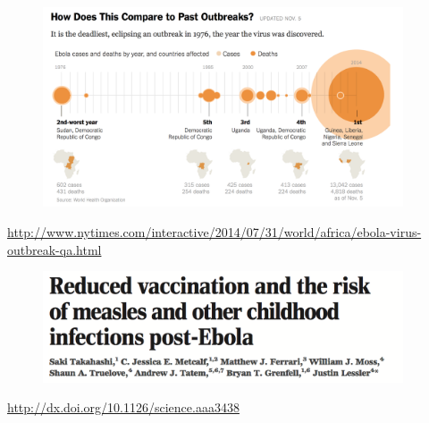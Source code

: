 \documentclass[aspectratio=169]{beamer}
\begin{document}
%
%
%
%
\begin{frame}

\begin{figure}
\includegraphics[width=0.95\textwidth]{figures/ebola_timeline}
\end{figure}

\tiny{\url{http://www.nytimes.com/interactive/2014/07/31/world/africa/ebola-virus-outbreak-qa.html}}

\note{

}

\end{frame}
\begin{frame}

\begin{figure}
\includegraphics[width=0.95\textwidth]{figures/takahashi_reduced_2015_title}
\end{figure}

\vfill

\url{http://dx.doi.org/10.1126/science.aaa3438}


\end{frame}
\end{document}
